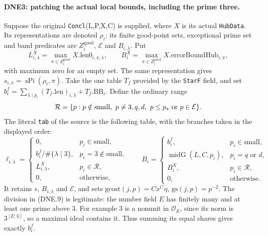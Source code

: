 \documentclass[11pt,a4paper]{article}
\numberwithin{equation}{section}
\theoremstyle{remark}\newtheorem{remark}[theorem]{Remark}
\begin{document}
\paragraph{DNE3: patching the actual local bounds, including the prime three.}
\label{claim:DNE3}
Suppose the original \texttt{Concl}(L,P,X,C) is supplied, where
$X$ is its actual \texttt{Hub\allowbreak Data}.  Its representations are denoted
$\rho_i$; its finite good-point sets, exceptional prime set and band
predicates are $Z_i^{\mathrm{good}}$, $\mathcal E$ and $B_{i,\lambda}$.
Put
\[
 L^X_{i,\lambda}=\max_{\pi\in Z_i^{\mathrm{good}}}
                       X.\mathrm{len0}_{i,\pi,\lambda},\qquad
 B_i^X=\max_{\pi\in Z_i^{\mathrm{good}}}
                       X.\mathrm{errorBoundHub}_{i,\pi},           \tag{DNE.8}
\]
with maximum zero for an empty set.  The same representation gives
$s_{i,\pi}=\operatorname{sPi}(\rho_i,\pi)$.
Take the one table $T_f$ provided by the \texttt{Star\allowbreak F} field, and set
$b_i^f=\sum_{\lambda\mid p_i}(T_f.\mathrm{len})_{i,\lambda}
             +T_f.\mathrm{BB}_i$.
Define the ordinary range
\[
 \mathcal R=\{p:p\notin\mathrm{small},\ p\ne3,q,d,
                         \ p\le p_*\ \hbox{or}\ p\in\mathcal E\}.
\]
The literal \texttt{tab} of the source is the following table,
with the branches taken in the displayed order:
\[
 \ell_{i,\lambda}=
 \begin{cases}
  0,&p_i\in\mathrm{small},\\
  b_i^f/\#\{\lambda\mid3\},&p_i=3\notin\mathrm{small},\\
  L^X_{i,\lambda},&p_i\in\mathcal R,\\
  0,&\text{otherwise},
 \end{cases}\qquad
 B_i=
 \begin{cases}
  b_i^f,&p_i\in\mathrm{small},\\
  \operatorname{midG}(L,C,p_i),&p_i=q\text{ or }d,\\
  B_i^X,&p_i\in\mathcal R,\\
  0,&\text{otherwise}.
 \end{cases}                                                   \tag{DNE.9}
\]
It retains $s$, $B_{i,\lambda}$ and $\mathcal E$, and sets
$\mathrm{gcost}(j,p)=Cx^C\eta$, $\mathrm{gs}(j,p)=p^{-2}$.
The division in (DNE.9) is legitimate: the number field $E$ has
finitely many and at least one prime above $3$.  For example $3$
is a nonunit in $\mathcal O_E$, since its norm is
$3^{[E:\mathbb Q]}$, so a maximal ideal contains it.
Thus summing its equal shares gives exactly $b_i^f$.
\end{document}
